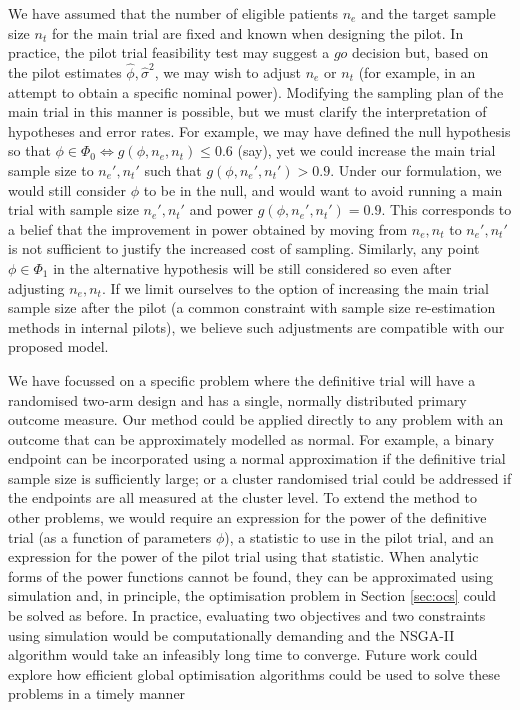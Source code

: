 \documentclass[AMA,STIX1COL]{WileyNJD-v2}
\begin{document}
We have assumed that the number of eligible patients $n_e$ and the target sample size $n_t$ for the main trial are fixed and known when designing the pilot. In practice, the pilot trial feasibility test may suggest a $go$ decision but, based on the pilot estimates $\hat{\phi}, \hat{\sigma}^2$, we may wish to adjust $n_e$ or $n_t$ (for example, in an attempt to obtain a specific nominal power). Modifying the sampling plan of the main trial in this manner is possible, but we must clarify the interpretation of hypotheses and error rates. For example, we may have defined the null hypothesis so that $\phi \in \Phi_0 \Leftrightarrow g(\phi, n_e, n_t) \leq 0.6$ (say), yet we could increase the main trial sample size to $n_e', n_t'$ such that $g(\phi, n_e', n_t') > 0.9$. Under our formulation, we would still consider $\phi$ to be in the null, and would want to avoid running a main trial with sample size $n_e', n_t'$ and power $g(\phi, n_e', n_t') = 0.9$. This corresponds to a belief that the improvement in power obtained by moving from $n_e, n_t$ to $n_e', n_t'$ is not sufficient to justify the increased cost of sampling. Similarly, any point $\phi \in \Phi_1$ in the alternative hypothesis will be still considered so even after adjusting $n_e, n_t$. If we limit ourselves to the option of increasing the main trial sample size after the pilot (a common constraint with sample size re-estimation methods in internal pilots\cite{Friede2006}), we believe such adjustments are compatible with our proposed model.


We have focussed on a specific problem where the definitive trial will have a randomised two-arm design and has a single, normally distributed primary outcome measure. Our method could be applied directly to any problem with an outcome that can be approximately modelled as normal. For example, a binary endpoint can be incorporated using a normal approximation if the definitive trial sample size is sufficiently large; or a cluster randomised trial could be addressed if the endpoints are all measured at the cluster level. To extend the method to other problems, we would require an expression for the power of the definitive trial (as a function of parameters $\phi$), a statistic to use in the pilot trial, and an expression for the power of the pilot trial using that statistic. When analytic forms of the power functions cannot be found, they can be approximated using simulation \cite{Landau2013} and, in principle, the optimisation problem in Section \ref{sec:ocs} could be solved as before. In practice, evaluating two objectives and two constraints using simulation would be computationally demanding and the NSGA-II algorithm would take an infeasibly long time to converge. Future work could explore how efficient global optimisation algorithms \cite{Jones2001} could be used to solve these problems in a timely manner 
\end{document}
